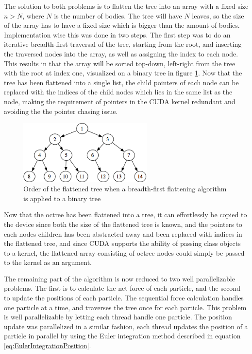 The solution to both problems is to flatten the tree into an array with a fixed size $n > N$, where $N$ is the number of bodies. The tree will have $N$ leaves, so the size of the array has to have a fixed size which is bigger than the amount of bodies. Implementation wise this was done in two steps.
The first step was to do an iterative breadth-first traversal of the tree, starting from the root, and inserting the traversed nodes into the array, as well as assigning the index to each node. This results in that the array will be sorted top-down, left-right from the tree with the root at index one, visualized on a binary tree in figure \ref{fig:BreadthFirstTreeIndices}. Now that the tree has been flattened into a single list, the child pointers of each node can be replaced with the indices of the child nodes which lies in the same list as the node, making the requirement of pointers in the CUDA kernel redundant and avoiding the the pointer chasing issue.

\begin{figure}[!h]
    \centering
    \includegraphics[width=0.6\textwidth]{Method/Figs/breadthFirstTree.png}
    \caption{Order of the flattened tree when a breadth-first flattening algorithm is applied to a binary tree}
    \label{fig:BreadthFirstTreeIndices}
\end{figure}


Now that the octree has been flattened into a tree, it can effortlessly be copied to the device since both the size of the flattened tree is known, and the pointers to each nodes children has been abstracted away and been replaced with indices in the flattened tree, and since CUDA supports the ability of passing class objects to a kernel, the flattened array consisting of octree nodes could simply be passed to the kernel as an argument. 

The remaining part of the algorithm is now reduced to two well parallelizable problems. The first is to calculate the net force of each particle, and the second to update the positions of each particle. The sequential force calculation handles one particle at a time, and traverses the tree once for each particle. This problem is well parallelizable by letting each thread handle one particle. The position update was parallelized in a similar fashion, each thread updates the position of a particle in parallel by using the Euler integration method described in equation \ref{eq:EulerIntegrationPosition}.

